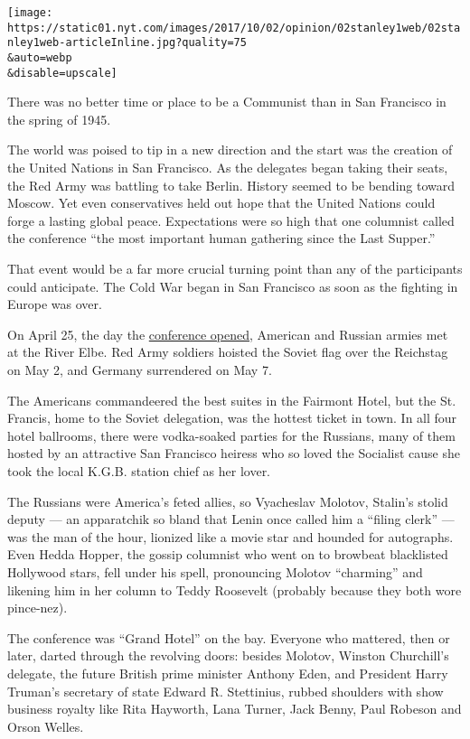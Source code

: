 \texttt{[image: https://static01.nyt.com/images/2017/10/02/opinion/02stanley1web/02stanley1web-articleInline.jpg?quality=75\\\&auto=webp\\\&disable=upscale]}

There was no better time or place to be a Communist than in San
Francisco in the spring of 1945.

The world was poised to tip in a new direction and the start was the
creation of the United Nations in San Francisco. As the delegates began
taking their seats, the Red Army was battling to take Berlin. History
seemed to be bending toward Moscow. Yet even conservatives held out hope
that the United Nations could forge a lasting global peace. Expectations
were so high that one columnist called the conference ``the most
important human gathering since the Last Supper.''

That event would be a far more crucial turning point than any of the
participants could anticipate. The Cold War began in San Francisco as
soon as the fighting in Europe was over.

On April 25, the day the
\href{https://learning.blogs.nytimes.com/2012/04/25/april-25-1945-conference-to-form-un-meets-as-allied-forces-near-victory-over-nazis/?mcubz=0}{conference
opened}, American and Russian armies met at the River Elbe. Red Army
soldiers hoisted the Soviet flag over the Reichstag on May 2, and
Germany surrendered on May 7.

The Americans commandeered the best suites in the Fairmont Hotel, but
the St. Francis, home to the Soviet delegation, was the hottest ticket
in town. In all four hotel ballrooms, there were vodka-soaked parties
for the Russians, many of them hosted by an attractive San Francisco
heiress who so loved the Socialist cause she took the local K.G.B.
station chief as her lover.

The Russians were America's feted allies, so Vyacheslav Molotov,
Stalin's stolid deputy --- an apparatchik so bland that Lenin once
called him a ``filing clerk'' --- was the man of the hour, lionized like
a movie star and hounded for autographs. Even Hedda Hopper, the gossip
columnist who went on to browbeat blacklisted Hollywood stars, fell
under his spell, pronouncing Molotov ``charming'' and likening him in
her column to Teddy Roosevelt (probably because they both wore
pince-nez).

The conference was ``Grand Hotel'' on the bay. Everyone who mattered,
then or later, darted through the revolving doors: besides Molotov,
Winston Churchill's delegate, the future British prime minister Anthony
Eden, and President Harry Truman's secretary of state Edward R.
Stettinius, rubbed shoulders with show business royalty like Rita
Hayworth, Lana Turner, Jack Benny, Paul Robeson and Orson Welles.

